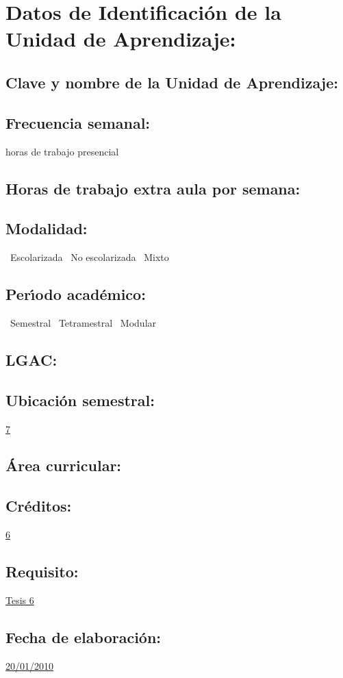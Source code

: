 \documentclass[10 pt]{article}
\begin{document}


\section{Datos de Identificaci\'{o}n de la Unidad de Aprendizaje:}
\subsection{Clave y nombre de la Unidad de Aprendizaje:} 
\subsection{Frecuencia semanal:} horas de trabajo presencial 
\subsection{Horas de trabajo extra aula por semana:} 
\subsection{Modalidad:} \yes~Escolarizada \no~No escolarizada \no~Mixto
\subsection{Per\'{\i}odo acad\'{e}mico:} \yes~Semestral
\no~Tetramestral \no~Modular
\subsection{LGAC:} \underline{\odsi}
\subsection{Ubicaci\'{o}n semestral:} \underline{7}
\subsection{\'{A}rea curricular:} \underline{\pi}
\subsection{Cr\'{e}ditos:} \underline{6}
\subsection{Requisito:} \underline{Tesis 6}
\subsection{Fecha de elaboraci\'{o}n:} \underline{20/01/2010}
\end{document}
